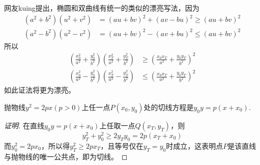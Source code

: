 网友kuing提出，椭圆和双曲线有统一的类似的漂亮写法，因为
\begin{align*}
  (a^2+b^2)(u^2+v^2) & =  (au+bv)^2+(av-bu)^2 \geqslant (au+bv)^2 \\
  (a^2-b^2)(u^2-v^2) & =  (au+bv)^2-(av+bu)^2 \leqslant (au+bv)^2 
\end{align*}
所以
\begin{align*}
  \left( \frac{x_0^2}{a^2}+\frac{y_0^2}{b^2} \right) \left( \frac{x_T^2}{a^2}+\frac{y_T^2}{b^2} \right) & \geqslant  \left( \frac{x_0x_T}{a^2}+\frac{y_0y_T}{b^2} \right)^2 \\
  \left( \frac{x_0^2}{a^2}-\frac{y_0^2}{b^2} \right) \left( \frac{x_T^2}{a^2}-\frac{y_T^2}{b^2} \right) & \leqslant  \left( \frac{x_0x_T}{a^2}+\frac{y_0y_T}{b^2} \right)^2 
\end{align*}
如此证法将更为漂亮。

\begin{theorem}
  抛物线$y^2=2px(p>0)$上任一点$P(x_0,y_0)$处的切线方程是$y_0y=p(x+x_0)$.
\end{theorem}

\begin{proof}[证明]
  在直线$y_0y=p(x+x_0)$上任取一点$Q(x_T,y_T)$，则
  \[ y_T^2+y_0^2 \geqslant 2y_Ty_0=2p(x_T+x_0) \]
  而$y_0^2=2px_0$，所以得$y_T^2 \geqslant 2px_T$，且等号仅在$y_T=y_0$时成立，这表明点$P$是该直线与抛物线的唯一公共点，即为切线。
\end{proof}


